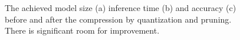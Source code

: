 \begin{figure}[!t]
\centering
{}
\hfill
{}
\hfill
{}
\caption{The achieved model size (a) inference time (b) and accuracy (c) before and after the compression by quantization and pruning.
There is significant room for improvement.}
\label{fig:motivation}
\end{figure}